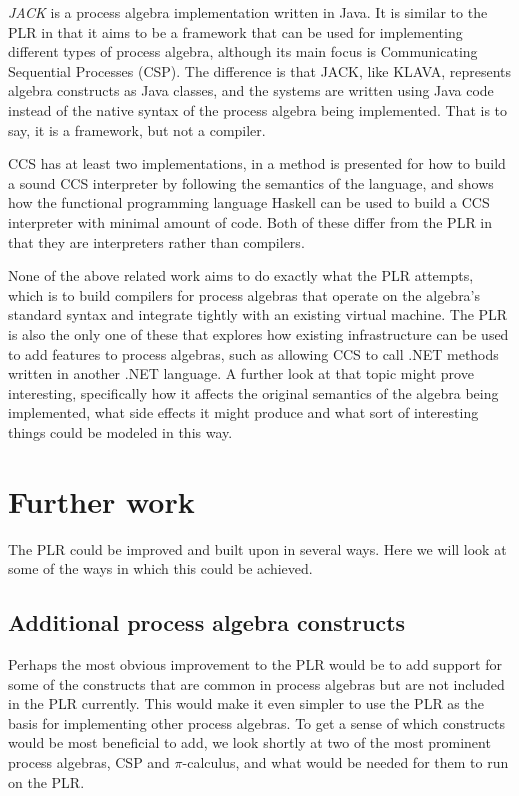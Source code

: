 	\textit{JACK} \cite{jack} is a process algebra implementation written in 
	Java. It is similar to the PLR in that it aims to be a framework that can be
	used for implementing different types of process algebra, although its main
	focus is Communicating Sequential Processes (CSP). The difference is that 
	JACK, like KLAVA, represents algebra constructs as Java classes, and the  
	systems are written using Java code instead of the native syntax of the 
	process algebra being implemented. That is to say, it is a framework, but 
	not a compiler.
	
	CCS has at least two implementations, in \cite{build_ccs_interpreter} a 
	method is presented for how to build a sound CCS interpreter by following 
	the semantics of the language, and \cite{ccs_interpreter} shows how the 
	functional programming language Haskell can be used to build a CCS 
	interpreter with minimal amount of code. Both of these differ from the PLR 
	in that they are interpreters rather than compilers.
	
	None of the above related work aims to do exactly what the PLR attempts, 
	which is to build compilers for process algebras that operate on the 		
	algebra's standard syntax and integrate tightly with an existing virtual 
	machine. The PLR is also the only one of these that explores how existing 
	infrastructure can be used to add features to process algebras, such as 
	allowing CCS to call .NET methods written in another .NET language. A 
	further look at that topic might prove interesting, specifically how it 
	affects the original semantics of the algebra being implemented, what side 
	effects it might produce and what sort of interesting things could be
	modeled in this way.

\section{Further work}

	The PLR could be improved and built upon in several ways. Here we will look 
	at some of the ways in which this could be achieved.
	
	\subsection{Additional process algebra constructs}
	
	Perhaps the most obvious improvement to the PLR would be to add support for 
	some of the constructs that are common in process algebras but are not 
	included in the PLR currently. This would make it even simpler to use the 
	PLR as the basis for implementing other process algebras. To get a sense of 
	which constructs would be most beneficial to add, we look shortly at two
	of the most prominent process algebras, CSP and $\pi$-calculus, and 
	what would be needed for them to run on the PLR.
	
